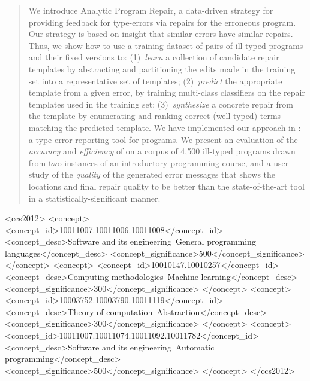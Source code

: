 \documentclass[sigplan,screen]{acmart}
\begin{document}
\begin{abstract}
We introduce Analytic Program Repair, a data-driven
strategy for providing feedback for type-errors via
repairs for the erroneous program.
%
Our strategy is based on
insight that similar errors have similar repairs.
Thus, we show how to use a training dataset of
pairs of ill-typed programs  and their fixed versions to:
%
(1)~\emph{learn} a collection of candidate repair templates
    by abstracting and partitioning the edits made in the
    training set into a representative set of templates;
%
(2)~\emph{predict} the appropriate template from a given error,
    by training multi-class classifiers on the repair templates
    used in the training set;
%
(3)~\emph{synthesize} a concrete repair from the template
   by enumerating and ranking correct (\eg well-typed)
   terms matching the predicted template.
%
We have implemented our approach in \toolname: a type error reporting
tool for \ocaml programs. We present an evaluation of the
\emph{accuracy} and \emph{efficiency} of \toolname on a corpus
of 4,500 ill-typed \ocaml programs drawn from two instances of an
introductory programming course, and a user-study of the \emph{quality}
of the generated error messages that shows the locations and
final repair quality to be better than the state-of-the-art tool
in a statistically-significant manner.
\end{abstract}


\begin{CCSXML}
  <ccs2012>
    <concept>
        <concept_id>10011007.10011006.10011008</concept_id>
        <concept_desc>Software and its engineering~General programming languages</concept_desc>
        <concept_significance>500</concept_significance>
        </concept>
    <concept>
        <concept_id>10010147.10010257</concept_id>
        <concept_desc>Computing methodologies~Machine learning</concept_desc>
        <concept_significance>300</concept_significance>
        </concept>
    <concept>
        <concept_id>10003752.10003790.10011119</concept_id>
        <concept_desc>Theory of computation~Abstraction</concept_desc>
        <concept_significance>300</concept_significance>
        </concept>
    <concept>
        <concept_id>10011007.10011074.10011092.10011782</concept_id>
        <concept_desc>Software and its engineering~Automatic programming</concept_desc>
        <concept_significance>500</concept_significance>
        </concept>
  </ccs2012>
\end{CCSXML}
\end{document}
